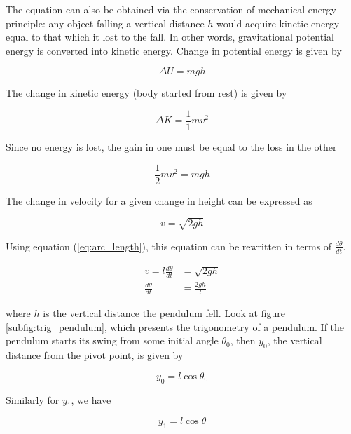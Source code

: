 The equation can also be obtained via the conservation of mechanical energy
principle: any object falling a vertical distance $h$ would acquire kinetic
energy equal to that which it lost to the fall. In other words, gravitational
potential energy is converted into kinetic energy. Change in potential energy is
given by

\begin{equation*}
  \Delta U = mgh
\end{equation*}

The change in kinetic energy (body started from rest) is given by

\begin{equation*}
  \Delta K = \frac{1}{1}mv^2
\end{equation*}

Since no energy is lost, the gain in one must be equal to the loss in the other

\begin{equation*}
  \frac{1}{2}mv^2 = mgh
\end{equation*}

The change in velocity for a given change in height can be expressed as

\begin{equation*}
  v = \sqrt{2gh}
\end{equation*}

Using equation (\ref{eq:arc_length}), this equation can be rewritten in terms of
$\frac{d\theta}{dt}$.

\begin{align}
  v = l\frac{d\theta}{dt} &= \sqrt{2gh} \nonumber \\
  \frac{d\theta}{dt} &= \frac{2gh}{l} \label{eq:energy_dtheta}
\end{align}

where $h$ is the vertical distance the pendulum fell. Look at figure \ref{subfig:trig_pendulum}, which presents the trigonometry of a pendulum. If the pendulum
starts its swing from some initial angle $\theta_0$, then $y_0$, the vertical
distance from the pivot point, is given by

\begin{equation*}
  y_0 = l\cos\theta_0
\end{equation*}

Similarly for $y_1$, we have

\begin{equation*}
  y_1 = l\cos\theta
\end{equation*}

